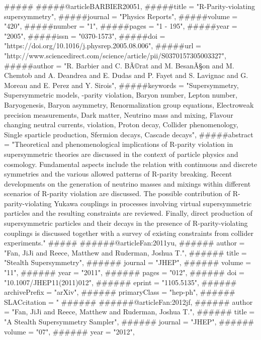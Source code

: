 {{#####}
#####@article{BARBIER20051,
#####title = "R-Parity-violating supersymmetry",
#####journal = "Physics Reports",
#####volume = "420",
#####number = "1",
#####pages = "1 - 195",
#####year = "2005",
#####issn = "0370-1573",
#####doi = "https://doi.org/10.1016/j.physrep.2005.08.006",
#####url = "http://www.sciencedirect.com/science/article/pii/S0370157305003327",
#####author = "R. Barbier and C. BÃ©rat and M. BesanÃ§on and M. Chemtob and A. Deandrea and E. Dudas and P. Fayet and S. Lavignac and G. Moreau and E. Perez and Y. Sirois",
#####keywords = "Supersymmetry, Supersymmetric models, -parity violation, Baryon number, Lepton number, Baryogenesis, Baryon asymmetry, Renormalization group equations, Electroweak precision measurements, Dark matter, Neutrino mass and mixing, Flavour changing neutral currents,  violation, Proton decay, Collider phenomenology, Single sparticle production, Sfermion decays, Cascade decays",
#####abstract = "Theoretical and phenomenological implications of R-parity violation in supersymmetric theories are discussed in the context of particle physics and cosmology. Fundamental aspects include the relation with continuous and discrete symmetries and the various allowed patterns of R-parity breaking. Recent developments on the generation of neutrino masses and mixings within different scenarios of R-parity violation are discussed. The possible contribution of R-parity-violating Yukawa couplings in processes involving virtual supersymmetric particles and the resulting constraints are reviewed. Finally, direct production of supersymmetric particles and their decays in the presence of R-parity-violating couplings is discussed together with a survey of existing constraints from collider experiments."
#####}
######@article{Fan:2011yu,
######      author         = "Fan, JiJi and Reece, Matthew and Ruderman, Joshua T.",
######      title          = "{Stealth Supersymmetry}",
######      journal        = "JHEP",
######      volume         = "11",
######      year           = "2011",
######      pages          = "012",
######      doi            = "10.1007/JHEP11(2011)012",
######      eprint         = "1105.5135",
######      archivePrefix  = "arXiv",
######      primaryClass   = "hep-ph",
######      SLACcitation   = "%
######}
######@article{Fan:2012jf,
######      author         = "Fan, JiJi and Reece, Matthew and Ruderman, Joshua T.",
######      title          = "{A Stealth Supersymmetry Sampler}",
######      journal        = "JHEP",
######      volume         = "07",
######      year           = "2012",
}}
